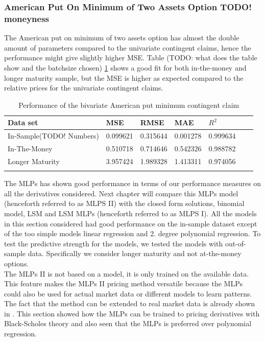 \subsubsection{American Put On Minimum of Two Assets Option TODO! moneyness}
The American put on minimum of two assets option has almost the double amount of parameters compared to the univariate contingent claims, hence the performance might give slightly higher MSE. Table (TODO: what does the table show and the batchsize chosen) \ref{tab:AmerMinPerformanceComparision} shows a good fit for both in-the-money and longer maturity sample, but the MSE is higher as expected compared to the relative prices for the univariate contingent claims. \\ 

\begin{table}[th]
\caption{Performance of the bivariate American put minimum contingent claim}
\label{tab:AmerMinPerformanceComparision}
\centering
\begin{tabular}{l l l l l l l }
\toprule
\textbf{Data set} & \textbf{MSE} & \textbf{RMSE} & \textbf{MAE} & \textbf{$R^2$} \\
\midrule
In-Sample(TODO! Numbers) & 0.099621 & 0.315644 & 0.001278 & 0.999634\\
In-The-Money & 0.510718 & 0.714646 & 0.542326 & 0.988782\\
Longer Maturity & 3.957424 & 1.989328 & 1.413311 & 0.974056\\
\bottomrule\\
\end{tabular}
\end{table}

The MLPs has shown good performance in terms of our performance measures on all the derivatives considered. Next chapter will compare this MLPs model (henceforth referred to as MLPS II) with the closed form solutions, binomial model, LSM and LSM MLPs (henceforth referred to as MLPS I). All the models in this section considered had good performance on the in-sample dataset except of the too simple models linear regression and 2. degree polynomial regression. To test the predictive strength for the models, we tested the models with out-of-sample data. Specifically we consider longer maturity and not at-the-money options.\\

The MLPs II is not based on a model, it is only trained on the available data. This feature makes the MLPs II pricing method versatile because the MLPs could also be used for actual market data or different models to learn patterns. The fact that the method can be extended to real market data is already shown in \parencite{GasparRaquel20}. This section showed how the MLPs can be trained to pricing derivatives with Black-Scholes theory and also seen that the MLPs is preferred over polynomial regression.









